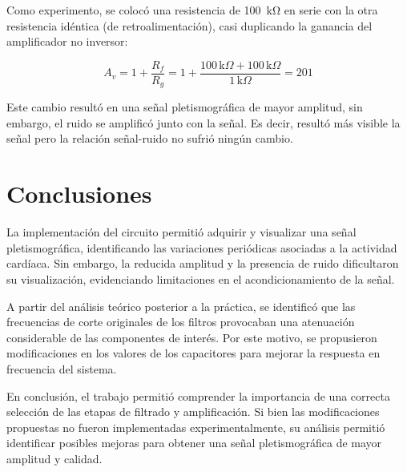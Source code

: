 \documentclass[10pt]{article}
\begin{document}
Como experimento, se colocó una resistencia de \SI{100}{\kilo\ohm} en serie con la otra resistencia idéntica (de retroalimentación), casi duplicando la ganancia del amplificador no inversor:

\begin{equation}
    A_v = 1 + \frac{R_f}{R_g}
    = 1 + \frac{100\,\text{k}\Omega+100\,\text{k}\Omega}{1\,\text{k}\Omega}
    = 201
\end{equation}

Este cambio resultó en una señal pletismográfica de mayor amplitud, sin embargo, el ruido se amplificó junto con la señal. Es decir, resultó más visible la señal pero la relación señal-ruido no sufrió ningún cambio.


\section{Conclusiones}

La implementación del circuito permitió adquirir y visualizar una señal pletismográfica, identificando las variaciones periódicas asociadas a la actividad cardíaca. Sin embargo, la reducida amplitud y la presencia de ruido dificultaron su visualización, evidenciando limitaciones en el acondicionamiento de la señal.

A partir del análisis teórico posterior a la práctica, se identificó que las frecuencias de corte originales de los filtros provocaban una atenuación considerable de las componentes de interés. Por este motivo, se propusieron modificaciones en los valores de los capacitores para mejorar la respuesta en frecuencia del sistema.

En conclusión, el trabajo permitió comprender la importancia de una correcta selección de las etapas de filtrado y amplificación. Si bien las modificaciones propuestas no fueron implementadas experimentalmente, su análisis permitió identificar posibles mejoras para obtener una señal pletismográfica de mayor amplitud y calidad.
\end{document}
